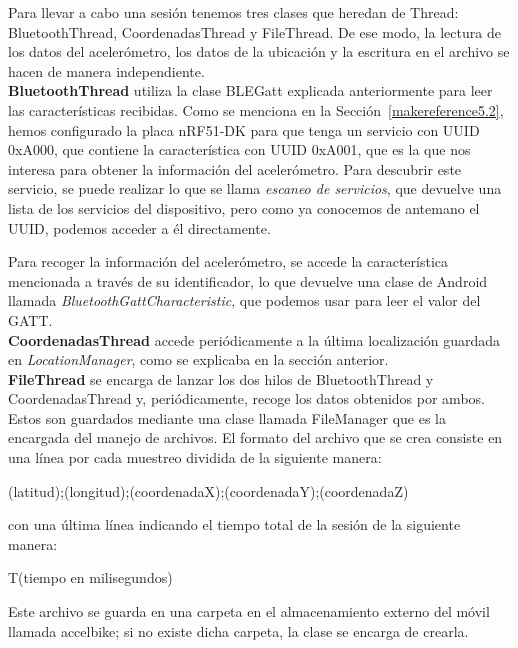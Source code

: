 Para llevar a cabo una sesión tenemos tres clases que heredan de Thread: BluetoothThread, CoordenadasThread y FileThread. De ese modo, la lectura de los datos del acelerómetro, los datos de la ubicación y la escritura en el archivo se hacen de manera independiente.\\

\textbf{BluetoothThread} utiliza la clase BLEGatt explicada anteriormente para leer las características recibidas. Como se menciona en la Sección~\ref{makereference5.2}, hemos configurado la placa nRF51-DK para que tenga un servicio con UUID 0xA000, que contiene la característica con UUID 0xA001, que es la que nos interesa para obtener la información del acelerómetro. Para descubrir este servicio, se puede realizar lo que se llama \textit{escaneo de servicios}, que devuelve una lista de los servicios del dispositivo, pero como ya conocemos de antemano el UUID, podemos acceder a él directamente.

Para recoger la información del acelerómetro, se accede la característica mencionada a través de su identificador, lo que devuelve una clase de Android llamada \textit{BluetoothGattCharacteristic}, que podemos usar para leer el valor del GATT.\\

\textbf{CoordenadasThread} accede periódicamente a la última localización guardada en \textit{LocationManager}, como se explicaba en la sección anterior.\\

\textbf{FileThread} se encarga de lanzar los dos hilos de BluetoothThread y CoordenadasThread y, periódicamente, recoge los datos obtenidos por ambos. Estos son guardados mediante una clase llamada FileManager que es la encargada del manejo de archivos. El formato del archivo que se crea consiste en una línea por cada muestreo dividida de la siguiente manera:

\begin{center}
(latitud);(longitud);(coordenadaX);(coordenadaY);(coordenadaZ)
\end{center}

con una última línea indicando el tiempo total de la sesión de la siguiente manera: 

\begin{center}
T(tiempo en milisegundos)
\end{center}

Este archivo se guarda en una carpeta en el almacenamiento externo del móvil llamada accelbike; si no existe dicha carpeta, la clase se encarga de crearla.

